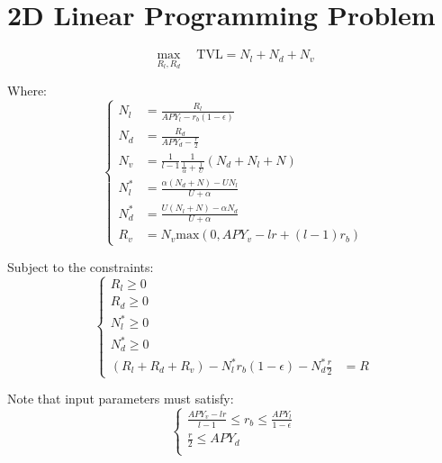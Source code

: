 \documentclass{article}
\begin{document}
\section{2D Linear Programming Problem}

\begin{equation}
\max_{R_l, R_d} \quad \text{TVL} = N_l + N_d + N_v
\end{equation}


Where:
\begin{equation}
\left\{
\begin{aligned}
N_l &= \frac{R_l}{APY_l - r_b(1-\epsilon)}\\
N_d &= \frac{R_d}{APY_d - \frac{r}{2}}\\
N_v&= \frac{1}{l-1}\frac{1}{\frac{1}{\alpha}  + \frac{1}{U}}(N_d+N_l+N)\\
N_l^* &= \frac{\alpha (N_d+N) - U N_l}{U + \alpha} \\
N_d^* &= \frac{U(N_l+N)-\alpha N_d}{U + \alpha}\\
R_v &= N_v \text{max}(0, APY_v - lr + (l-1)r_b)
\end{aligned}
\right.
\end{equation}

Subject to the constraints:
    \begin{equation}
    \left\{
    \begin{aligned}
    R_l \geq 0 \\
    R_d \geq 0 \\
    N_l^* \geq 0 \\
    N_d^* \geq 0 \\
    (R_l+R_d+R_v) - N_l^* r_b(1-\epsilon) - N_d^* \frac{r}{2} &= R
    \end{aligned}
    \right.
    \end{equation}


Note that input parameters must satisfy:
\begin{equation}
\left\{
\begin{aligned}
    \frac{APY_v - lr}{l-1}\leq r_b \leq \frac{APY_l}{1-\epsilon} \\
    \frac{r}{2} \leq APY_d\\
\end{aligned}
\right.
\end{equation}
\end{document}

